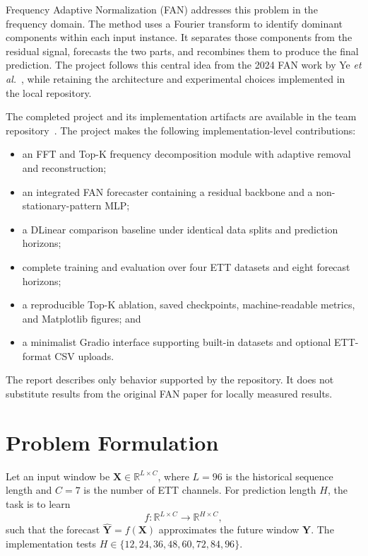 \documentclass[conference,10pt]{IEEEtran}
\begin{document}
Frequency Adaptive Normalization (FAN) addresses this problem in the frequency domain. The method uses a Fourier transform to identify dominant components within each input instance. It separates those components from the residual signal, forecasts the two parts, and recombines them to produce the final prediction. The project follows this central idea from the 2024 FAN work by Ye \emph{et al.}~\cite{fanpaper}, while retaining the architecture and experimental choices implemented in the local repository.

The completed project and its implementation artifacts are available in the team repository~\cite{fancode}. The project makes the following implementation-level contributions:
\begin{itemize}
    \item an FFT and Top-K frequency decomposition module with adaptive removal and reconstruction;
    \item an integrated FAN forecaster containing a residual backbone and a non-stationary-pattern MLP;
    \item a DLinear comparison baseline under identical data splits and prediction horizons;
    \item complete training and evaluation over four ETT datasets and eight forecast horizons;
    \item a reproducible Top-K ablation, saved checkpoints, machine-readable metrics, and Matplotlib figures; and
    \item a minimalist Gradio interface supporting built-in datasets and optional ETT-format CSV uploads.
\end{itemize}

The report describes only behavior supported by the repository. It does not substitute results from the original FAN paper for locally measured results.

\section{Problem Formulation}
Let an input window be
$\mathbf{X}\in\mathbb{R}^{L\times C}$,
where $L=96$ is the historical sequence length and $C=7$ is the number of ETT channels. For prediction length $H$, the task is to learn
\begin{equation}
f:\mathbb{R}^{L\times C}\rightarrow\mathbb{R}^{H\times C},
\end{equation}
such that the forecast $\widehat{\mathbf{Y}}=f(\mathbf{X})$ approximates the future window $\mathbf{Y}$. The implementation tests
$H\in\{12,24,36,48,60,72,84,96\}$.
\end{document}
